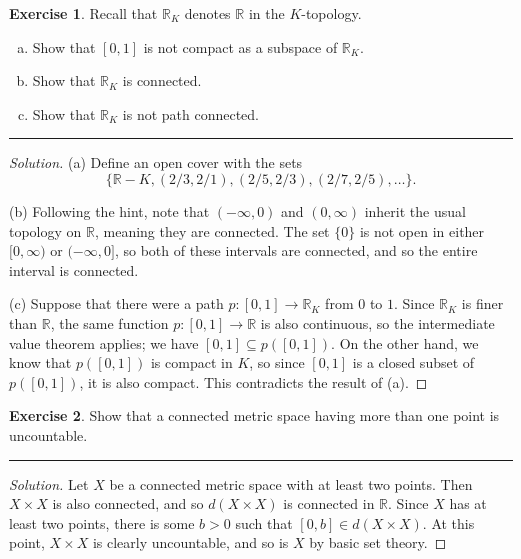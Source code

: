 \documentclass{article}
\theoremstyle{definition}
\newtheorem{exercise}{Exercise}[section]
\begin{document}
\pagebreak

\begin{exercise}
  Recall that $\mathbb{R}_K$ denotes $\mathbb{R}$ in the $K$-topology.
  \begin{enumerate}[(a)]
    \item Show that $[0,1]$ is not compact as a subspace of $\mathbb{R}_K$.
    \item Show that $\mathbb{R}_K$ is connected.
    \item Show that $\mathbb{R}_K$ is not path connected.
  \end{enumerate}
\end{exercise}
\hrule
\begin{proof}[Solution]
  (a) Define an open cover with the sets
  $$\{\mathbb{R}-K, (2/3,2/1),(2/5,2/3),(2/7,2/5),\dots\}.$$

  \vspace{0.5em}
  (b) Following the hint, note that $(-\infty, 0)$ and $(0,\infty)$ inherit the usual topology on $\mathbb{R}$, meaning they are connected. The set $\{0\}$ is not open in either $[0,\infty)$ or $(-\infty,0]$, so both of these intervals are connected, and so the entire interval is connected.

  \vspace{0.5em}
  (c) Suppose that there were a path $p:[0,1]\to\mathbb{R}_K$ from $0$ to $1$. Since $\mathbb{R}_K$ is finer than $\mathbb{R}$, the same function $p:[0,1]\to\mathbb{R}$ is also continuous, so the intermediate value theorem applies; we have $[0,1]\subseteq p([0,1])$. On the other hand, we know that $p([0,1])$ is compact in $K$, so since $[0,1]$ is a closed subset of $p([0,1])$, it is also compact. This contradicts the result of (a).
\end{proof}

\pagebreak

\begin{exercise}
  Show that a connected metric space having more than one point is uncountable.
\end{exercise}
\hrule
\begin{proof}[Solution]
  Let $X$ be a connected metric space with at least two points. Then $X\times X$ is also connected, and so $d(X\times X)$ is connected in $\mathbb{R}$. Since $X$ has at least two points, there is some $b>0$ such that $[0,b]\in d(X\times X)$. At this point, $X\times X$ is clearly uncountable, and so is $X$ by basic set theory.
\end{proof}

\pagebreak
\end{document}
